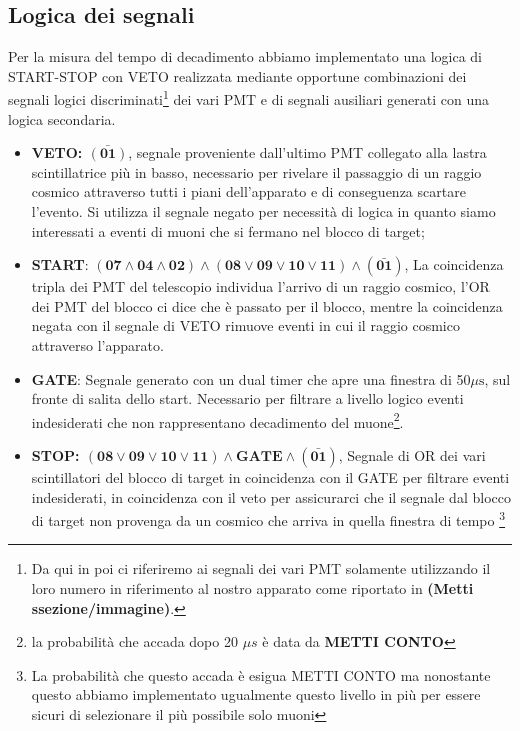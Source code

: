 \documentclass[10pt,a4paper]{article}
\begin{document}
\subsection{Logica dei segnali}
\begin{flushleft}
Per la misura del tempo di decadimento abbiamo implementato una logica di START-STOP con VETO realizzata mediante opportune combinazioni dei segnali logici discriminati\footnote{Da qui in poi ci riferiremo ai segnali dei vari PMT solamente utilizzando il loro numero in riferimento al nostro apparato come riportato in \textbf{(Metti ssezione/immagine)}.} dei vari PMT e di segnali ausiliari generati con una logica secondaria.

\begin{itemize}
    \item \textbf{VETO: $\bm{\bar{(01)}}$}, segnale proveniente dall'ultimo PMT collegato alla lastra scintillatrice più in basso, necessario per rivelare il passaggio di un raggio cosmico attraverso tutti i piani dell'apparato e di conseguenza scartare l'evento. Si utilizza  il segnale negato per necessità di logica in quanto siamo interessati a eventi di muoni che si fermano nel blocco di target;
    \item \textbf{START}: $\bm{(07\land04\land02)\land(08\lor09\lor10\lor11)\land (\bar{01})}$, La coincidenza tripla dei PMT del telescopio individua l'arrivo di un raggio cosmico, l'OR dei PMT del blocco ci dice che è passato per il blocco, mentre la coincidenza negata con il segnale di VETO rimuove eventi in cui il raggio cosmico attraverso l'apparato.
    \item \textbf{GATE}: Segnale generato con un dual timer che apre una finestra di 50$\mu \text{s}$, sul fronte di salita dello start. Necessario per filtrare a livello logico eventi indesiderati che non rappresentano decadimento del muone\footnote{la probabilità che accada dopo 20 $\mu s$ è data da \textbf{METTI CONTO}}.
    \item \textbf{STOP: $\bm{(08\lor09\lor10\lor11) \land \text{GATE} \land (\bar{01}) }$}, Segnale di OR dei vari scintillatori del blocco di target in coincidenza con il GATE per filtrare eventi indesiderati, in coincidenza con il veto per assicurarci che il segnale dal blocco di target non provenga da un cosmico che arriva in quella finestra di tempo \footnote{La probabilità che questo accada è esigua METTI CONTO ma nonostante questo abbiamo implementato ugualmente questo livello in più per essere sicuri di selezionare il più possibile solo muoni}


\end{itemize}
\end{flushleft}
\end{document}
